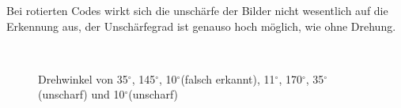 Bei rotierten Codes wirkt sich die unschärfe der Bilder nicht wesentlich auf die Erkennung aus, der Unschärfegrad ist genauso hoch möglich, wie ohne Drehung.
\begin{figure}[H]
  \centering
  \setlength{\fboxrule}{1pt}
  \\
  \caption{Drehwinkel von 35$^\circ$, 145$^\circ$, 10$^\circ$(falsch erkannt), 11$^\circ$, 170$^\circ$, 35$^\circ$(unscharf) und 10$^\circ$(unscharf)}
  \label{fig:eanrotate}
\end{figure}

